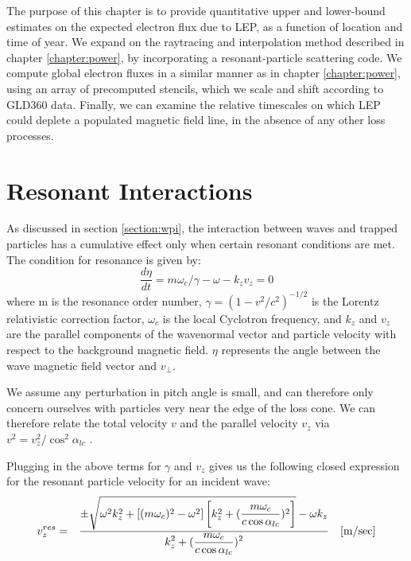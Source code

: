 The purpose of this chapter is to provide quantitative upper and lower-bound estimates on the expected electron flux due to LEP, as a function of location and time of year. We expand on the raytracing and interpolation method described in chapter \ref{chapter:power}, by incorporating a resonant-particle scattering code. We compute global electron fluxes in a similar manner as in chapter \ref{chapter:power}, using an array of precomputed stencils, which we scale and shift according to GLD360 data. Finally, we can examine the relative timescales on which LEP could deplete a populated magnetic field line, in the absence of any other loss processes.

\section{Resonant Interactions}
As discussed in section \ref{section:wpi}, the interaction between waves and trapped particles has a cumulative effect only when certain resonant conditions are met. The condition for resonance is given by:
\begin{equation}
\frac{d\eta}{dt} = m \omega_c/\gamma - \omega - k_z v_z = 0
\label{eqn:resonance_cond}
\end{equation} 
where m is the resonance order number, $\gamma = (1 - v^2/c^2)^{-1/2}$ is the Lorentz relativistic correction factor, $\omega_c$ is the local Cyclotron frequency, and $k_z$ and $v_z$ are the parallel components of the wavenormal vector and particle velocity with respect to the background magnetic field. $\eta$ represents the angle between the wave magnetic field vector and $v_\perp$.

We assume any perturbation in pitch angle is small, and can therefore only concern ourselves with particles very near the edge of the loss cone. We can therefore relate the total velocity $v$ and the parallel velocity $v_z$ via $v^2 = v_z^2/\cos^2\alpha_{lc}$ \citep{Lauben2001, Bortnik2006}.

Plugging in the above terms for $\gamma$ and $v_z$ gives us the following closed expression for the resonant particle velocity for an incident wave:
\begin{eqnarray}
v_z^{res} & = & \frac{\displaystyle \pm \sqrt{\omega^2 k_z^2 + \left[ (m \omega_c)^2 - \omega^2 \right] \left[k_z^2 + (\frac{m \omega_c}{c \cos \alpha_{lc}})^2\right]} - \omega k_z}{\displaystyle k_z^2 + (\frac{m \omega_c}{c \cos \alpha_{lc}})^2} \quad[\mathrm{m/sec}]
\label{eqn:vzres}
\end{eqnarray}

